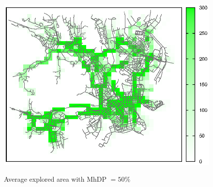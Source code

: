 \begin{figure}[htbp]
{\includegraphics[scale=0.85]{grafici/mappe/M2MShare_3_hop_50perc.eps}}
\caption{Average explored area with MhDP $= 50\%$\label{fig:mappaMultiHop_50}}
\end{figure}

